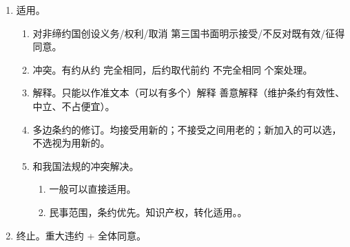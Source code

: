 \begin{enumerate}
\begin{enumerate}
\begin{enumerate}
\begin{enumerate}
                          \item 国际组织章程，需该组织有权机构接受。
                        \end{enumerate}
                        \begin{kk}{自行决定}
                          \begin{enumerate}
                            \item 同意。被保留的内容所取代。。
                            \item 小反对。保留的条款视为不存在。大反对。。
                          \end{enumerate}
                        \end{kk}
                \end{enumerate}
        \end{enumerate}
  \item 适用。
        \begin{enumerate}
          \item 对非缔约国创设义务/权利/取消 \yjt 第三国书面明示接受/不反对既有效/征得同意。
          \item 冲突。有约从约 \yjt 完全相同，后约取代前约 \yjt 不完全相同 \yjt 个案处理。
          \item 解释。只能以作准文本（可以有多个）解释 \yjt 善意解释（维护条约有效性、中立、不占便宜）。
          \item 多边条约的修订。均接受用新的；不接受之间用老的；新加入的可以选，不选视为用新的。
          \item 和我国法规的冲突解决。
                \begin{enumerate}
                  \item 一般可以直接适用。
                  \item 民事范围，条约优先。知识产权，转化适用。。
                \end{enumerate}
        \end{enumerate}
  \item 终止。重大违约 + 全体同意。
\end{enumerate}
